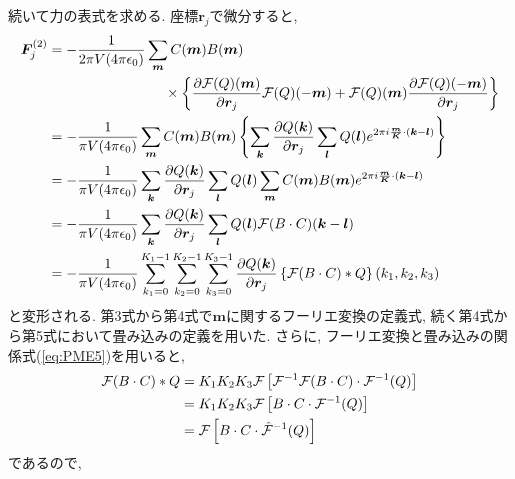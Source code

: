 続いて力の表式を求める. 座標$\bm{r}_{j}$で微分すると,
\begin{align}
    \bm{F}_{j}^{(2)}
 &=
    -\frac{1}{2 \pi V (4 \pi \epsilon_{0})} \sum_{\bm{m}} C(\bm{m}) B(\bm{m})
 \notag
 \\
 &~~~~~~~~~~~~~~~~~~~~~~~~~\times
 \left\{
           \frac{\partial \mathcal{F}(Q)(\bm{m})}{\partial \bm{r}_{j}}
           \mathcal{F}(Q) (- \bm{m})
          +\mathcal{F}(Q) (\bm{m})
           \frac{\partial \mathcal{F}(Q)(- \bm{m})}{\partial \bm{r}_{j}}
   \right\}
 \notag
 \\
 &=
   -\frac{1}{\pi V (4 \pi \epsilon_{0})} \sum_{\bm{m}} C(\bm{m}) B(\bm{m})
    \left\{
            \sum_{\bm{k}}
            \frac{\partial Q(\bm{k})}{\partial \bm{r}_{j}}
            \sum_{\bm{l}}
            Q(\bm{l})
            e^{2 \pi i \frac{\bm{m}}{\bm{K}} \cdot (\bm{k} - \bm{l})}
    \right\}
 \notag
 \\
 &=
   -\frac{1}{\pi V (4 \pi \epsilon_{0})}
    \sum_{\bm{k}}
    \frac{\partial Q(\bm{k})}{\partial \bm{r}_{j}}
    \sum_{\bm{l}}
     Q(\bm{l})
    \sum_{\bm{m}} C(\bm{m}) B(\bm{m})
    e^{2 \pi i \frac{\bm{m}}{\bm{K}} \cdot (\bm{k} - \bm{l})}
 \notag
 \\
 &=
   -\frac{1}{\pi V (4 \pi \epsilon_{0})}
    \sum_{\bm{k}}
    \frac{\partial Q(\bm{k})}{\partial \bm{r}_{j}}
    \sum_{\bm{l}}
     Q(\bm{l})
    \mathcal{F}(B \cdot C) (\bm{k} - \bm{l})
 \notag
 \\
 &=
   -\frac{1}{\pi V (4 \pi \epsilon_{0})}
    \sum_{k_{1}=0}^{K_{1}-1}
    \sum_{k_{2}=0}^{K_{2}-1}
    \sum_{k_{3}=0}^{K_{3}-1}
    \frac{\partial Q (\bm{k})}{\partial \bm{r}_{j}}
    \left\{
            \mathcal{F}(B \cdot C) * Q
    \right\} (k_{1}, k_{2}, k_{3})
 \label{eq:PME23}
\end{align}
と変形される. 第3式から第4式で$\bm{m}$に関するフーリエ変換の定義式, 続く第4式から第5式において畳み込みの定義を用いた.
さらに, フーリエ変換と畳み込みの関係式(\ref{eq:PME5})を用いると,
\begin{align}
    \mathcal{F} (B \cdot C) * Q
 &=
    K_{1} K_{2} K_{3}
    \mathcal{F}
    \left[
           \mathcal{F}^{-1} \mathcal{F} (B \cdot C) \cdot \mathcal{F}^{-1}(Q)
    \right]
 \notag
 \\
 &=
    K_{1} K_{2} K_{3}
    \mathcal{F}
    \left[
           B \cdot C \cdot \mathcal{F}^{-1} (Q)
    \right]
 \notag
 \\
 &=
 \mathcal{F}
 \left[
       B \cdot C \cdot \hat{\mathcal{F}}^{-1} (Q)
 \right]
\end{align}
であるので,
